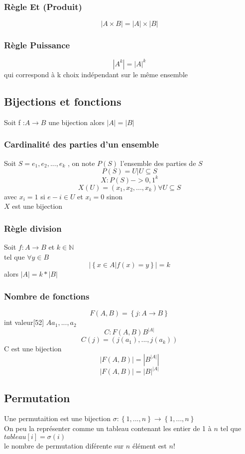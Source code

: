 \documentclass{report}
\newcommand{\N}{\mathbb{N}}
\begin{document}
\subsubsection{Règle Et (Produit)}
$$\left|A \times B\right|=|A|\times|B|$$
\subsubsection{Règle Puissance}
$$\left|A^k\right|=|A|^k$$
qui correspond à k choix indépendant sur le même ensemble\\
\subsection{Bijections et fonctions}
Soit f :$A\rightarrow B$ une bijection alors $|A|=|B|$\\
\subsubsection{Cardinalité des parties d'un ensemble}
Soit $S={e_1,e_2,...,e_k}$ , on note $P(S)$ l'ensemble des parties de $S$\\
$$P(S) = {U|U\subseteq S}$$
$$X:P(S)->{0,1}^k$$
$$X(U)=(x_1,x_2,...,x_k) \forall U \subseteq S$$
avec $x_i=1$ si $e-i \in U$ et $x_i=0$ sinon \\
$X$ est une bijection\\
\subsubsection{Règle division}
Soit $f : A \rightarrow B$ et $k \in \N$\\
tel que  $\forall y \in B$\\
$$\left|\left\{x \in A | f(x)=y\right\}\right|=k$$
alors $|A| =k*|B|$\\
\subsubsection{Nombre de fonctions}
$$F(A,B) =\left\{j:A\rightarrow B\right\}$$
int valeur[52] $A{a_1,...,a_2}$\\
$$C: F(A,B) B^{|A|}$$
$$C(j)=\left(j(a_1),...,j(a_k)\right)$$
C est une bijection\\
$$\left|F(A,B)\right|=\left|B^{|A|}\right|$$
$$\left|F(A,B)\right|=\left|B\right|^{|A|}$$
\subsection{Permutation}
Une permutaition est une bijection $\sigma : \left\{1,...,n\right\}\rightarrow\left\{1,...,n\right\}$\\
On peu la représenter comme un tableau contenant les entier de 1 à $n$ tel que $tableau[i]=\sigma(i)$\\
le nombre de permutation diférente sur $n$ élément est $ n!$\\
\end{document}

